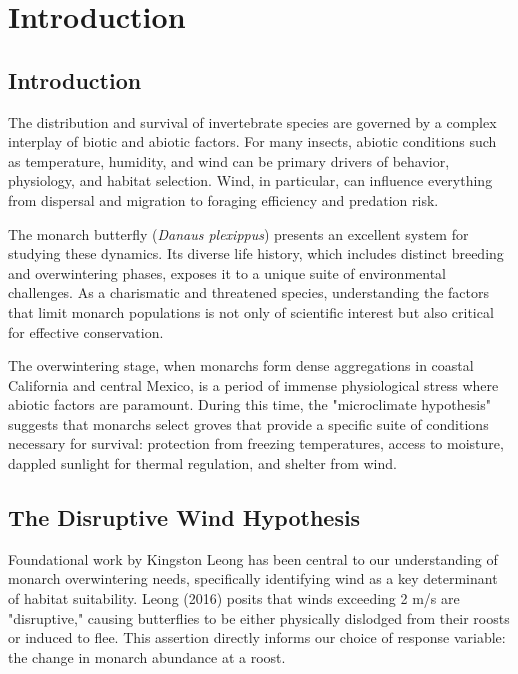 \usepackage{hyperref}
\usepackage{longtable}

\chapter{Introduction}
\label{ch:introduction}

\section{Introduction}

The distribution and survival of invertebrate species are governed by a complex interplay of biotic and abiotic factors. For many insects, abiotic conditions such as temperature, humidity, and wind can be primary drivers of behavior, physiology, and habitat selection. Wind, in particular, can influence everything from dispersal and migration to foraging efficiency and predation risk.

The monarch butterfly (\textit{Danaus plexippus}) presents an excellent system for studying these dynamics. Its diverse life history, which includes distinct breeding and overwintering phases, exposes it to a unique suite of environmental challenges. As a charismatic and threatened species, understanding the factors that limit monarch populations is not only of scientific interest but also critical for effective conservation.

The overwintering stage, when monarchs form dense aggregations in coastal California and central Mexico, is a period of immense physiological stress where abiotic factors are paramount. During this time, the "microclimate hypothesis" suggests that monarchs select groves that provide a specific suite of conditions necessary for survival: protection from freezing temperatures, access to moisture, dappled sunlight for thermal regulation, and shelter from wind.

\section{The Disruptive Wind Hypothesis}

Foundational work by Kingston Leong has been central to our understanding of monarch overwintering needs, specifically identifying wind as a key determinant of habitat suitability. Leong (2016) posits that winds exceeding 2 m/s are "disruptive," causing butterflies to be either physically dislodged from their roosts or induced to flee. This assertion directly informs our choice of response variable: the change in monarch abundance at a roost.

